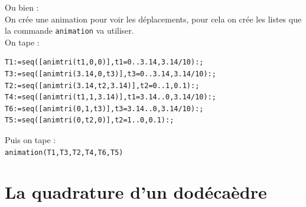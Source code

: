 \documentclass[a4paper,11pt]{book}
\begin{document}
Ou bien :\\
On cr\'ee une animation pour voir les d\'eplacements, pour cela on 
cr\'ee les listes que la commande {\tt animation} va utiliser.\\
On tape :\\
\begin{verbatim}
T1:=seq([animtri(t1,0,0)],t1=0..3.14,3.14/10):;
T3:=seq([animtri(3.14,0,t3)],t3=0..3.14,3.14/10):;
T2:=seq([animtri(3.14,t2,3.14)],t2=0..1,0.1):;
T4:=seq([animtri(t1,1,3.14)],t1=3.14..0,3.14/10):;
T6:=seq([animtri(0,1,t3)],t3=3.14..0,3.14/10):;
T5:=seq([animtri(0,t2,0)],t2=1..0,0.1):;
\end{verbatim}
Puis on tape :\\
{\tt animation(T1,T3,T2,T4,T6,T5)}
\section{La quadrature d'un dod\'eca\`edre}
\end{document}
